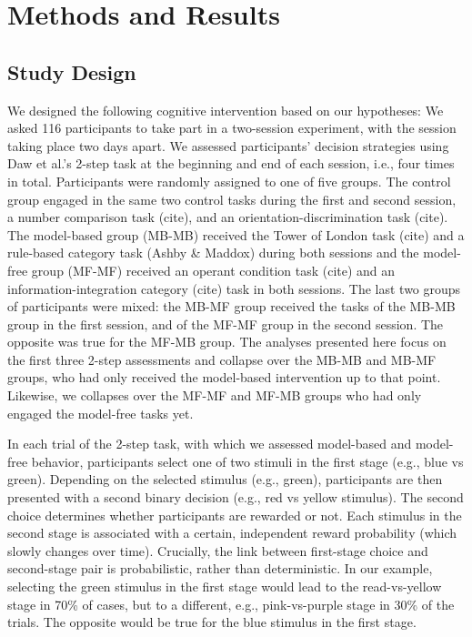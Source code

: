 \documentclass[11pt]{article} %
\begin{document}
\section{Methods and Results}
\subsection{Study Design}

We designed the following cognitive intervention based on our hypotheses: We asked 116 participants to take part in a two-session experiment, with the session taking place two days apart. We assessed participants' decision strategies using Daw et al.'s 2-step task at the beginning and end of each session, i.e., four times in total. Participants were randomly assigned to one of five groups. The control group engaged in the same two control tasks during the first and second session, a number comparison task (cite), and an orientation-discrimination task (cite). The model-based group (MB-MB) received the Tower of London task (cite) and a rule-based category task (Ashby \& Maddox) during both sessions and the model-free group (MF-MF) received an operant condition task (cite) and an information-integration category (cite) task in both sessions. The last two groups of participants were mixed: the MB-MF group received the tasks of the MB-MB group in the first session, and of the MF-MF group in the second session. The opposite was true for the MF-MB group. The analyses presented here focus on the first three 2-step assessments and collapse over the MB-MB and MB-MF groups, who had only received the model-based intervention up to that point. Likewise, we collapses over the MF-MF and MF-MB groups who had only engaged the model-free tasks yet.

In each trial of the 2-step task, with which we assessed model-based and model-free behavior, participants select one of two stimuli in the first stage (e.g., blue vs green). Depending on the selected stimulus (e.g., green), participants are then presented with a second binary decision (e.g., red vs yellow stimulus). The second choice determines whether participants are rewarded or not. Each stimulus in the second stage is associated with a certain, independent reward probability (which slowly changes over time). Crucially, the link between first-stage choice and second-stage pair is probabilistic, rather than deterministic. In our example, selecting the green stimulus in the first stage would lead to the read-vs-yellow stage in 70\% of cases, but to a different, e.g., pink-vs-purple stage in 30\% of the trials. The opposite would be true for the blue stimulus in the first stage.
\end{document}
